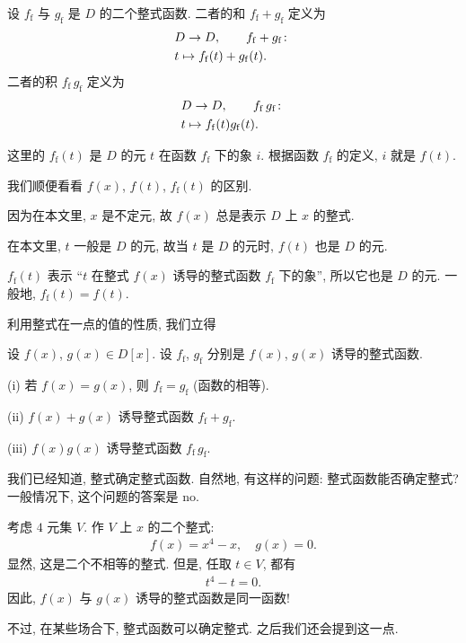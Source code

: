 \begin{definition}
    设 $f_\mathrm{f}$ 与 $g_\mathrm{f}$ 是 $D$ 的二个整式函数. 二者的和 $f_\mathrm{f} + g_\mathrm{f}$ 定义为
    \begin{align*}
         & D \to D, \tag*{$f_\mathrm{f} + g_\mathrm{f} \colon$} \\
         & t \mapsto f_\mathrm{f} (t) + g_\mathrm{f} (t).
    \end{align*}
    二者的积 $f_\mathrm{f} \, g_\mathrm{f}$ 定义为
    \begin{align*}
         & D \to D, \tag*{$f_\mathrm{f} \, g_\mathrm{f} \colon$} \\
         & t \mapsto f_\mathrm{f} (t) g_\mathrm{f} (t).
    \end{align*}
\end{definition}

\begin{remark}
    这里的 $f_{\mathrm{f}} (t)$ 是 $D$ 的元 $t$ 在函数 $f_{\mathrm{f}}$ 下的象 $i$. 根据函数 $f_{\mathrm{f}}$ 的定义, $i$ 就是 $f(t)$.

    我们顺便看看 $f(x)$, $f(t)$, $f_\mathrm{f} (t)$ 的区别.

    因为在本文里, $x$ 是不定元, 故 $f(x)$ 总是表示 $D$ 上 $x$ 的整式.

    在本文里, $t$ 一般是 $D$ 的元, 故当 $t$ 是 $D$ 的元时, $f(t)$ 也是 $D$ 的元.

    $f_\mathrm{f} (t)$ 表示 ``$t$ 在整式 $f(x)$ 诱导的整式函数 $f_\mathrm{f}$ 下的象'', 所以它也是 $D$ 的元. 一般地, $f_\mathrm{f} (t) = f(t)$.
\end{remark}

利用整式在一点的值的性质, 我们立得
\begin{proposition}
    设 $f(x)$, $g(x) \in D[x]$. 设 $f_\mathrm{f}$, $g_\mathrm{f}$ 分别是 $f(x)$, $g(x)$ 诱导的整式函数.

    (i) 若 $f(x) = g(x)$, 则 $f_\mathrm{f} = g_\mathrm{f}$ (函数的相等).

    (ii) $f(x) + g(x)$ 诱导整式函数 $f_\mathrm{f} + g_\mathrm{f}$.

    (iii) $f(x) g(x)$ 诱导整式函数 $f_\mathrm{f} \, g_\mathrm{f}$.
\end{proposition}

\begin{remark}
    我们已经知道, 整式确定整式函数. 自然地, 有这样的问题: 整式函数能否确定整式? 一般情况下, 这个问题的答案是 no.

    考虑 $4$ 元集 $V$. 作 $V$ 上 $x$ 的二个整式:
    \begin{align*}
        f(x) = x^4 - x, \quad g(x) = 0.
    \end{align*}
    显然, 这是二个不相等的整式. 但是, 任取 $t \in V$, 都有
    \begin{align*}
        t^4 - t = 0.
    \end{align*}
    因此, $f(x)$ 与 $g(x)$ 诱导的整式函数是同一函数!

    不过, 在某些场合下, 整式函数可以确定整式. 之后我们还会提到这一点.
\end{remark}

